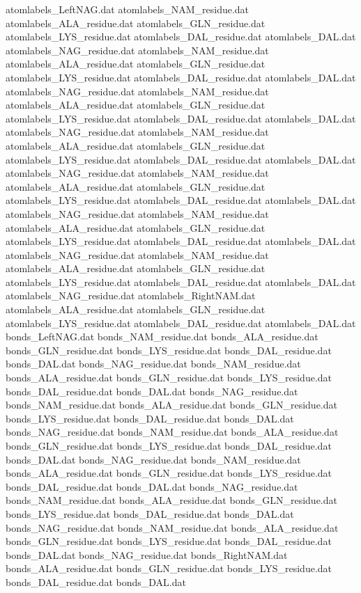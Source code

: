 atomlabels_LeftNAG.dat
atomlabels_NAM_residue.dat
atomlabels_ALA_residue.dat
atomlabels_GLN_residue.dat
atomlabels_LYS_residue.dat
atomlabels_DAL_residue.dat
atomlabels_DAL.dat
atomlabels_NAG_residue.dat
atomlabels_NAM_residue.dat
atomlabels_ALA_residue.dat
atomlabels_GLN_residue.dat
atomlabels_LYS_residue.dat
atomlabels_DAL_residue.dat
atomlabels_DAL.dat
atomlabels_NAG_residue.dat
atomlabels_NAM_residue.dat
atomlabels_ALA_residue.dat
atomlabels_GLN_residue.dat
atomlabels_LYS_residue.dat
atomlabels_DAL_residue.dat
atomlabels_DAL.dat
atomlabels_NAG_residue.dat
atomlabels_NAM_residue.dat
atomlabels_ALA_residue.dat
atomlabels_GLN_residue.dat
atomlabels_LYS_residue.dat
atomlabels_DAL_residue.dat
atomlabels_DAL.dat
atomlabels_NAG_residue.dat
atomlabels_NAM_residue.dat
atomlabels_ALA_residue.dat
atomlabels_GLN_residue.dat
atomlabels_LYS_residue.dat
atomlabels_DAL_residue.dat
atomlabels_DAL.dat
atomlabels_NAG_residue.dat
atomlabels_NAM_residue.dat
atomlabels_ALA_residue.dat
atomlabels_GLN_residue.dat
atomlabels_LYS_residue.dat
atomlabels_DAL_residue.dat
atomlabels_DAL.dat
atomlabels_NAG_residue.dat
atomlabels_NAM_residue.dat
atomlabels_ALA_residue.dat
atomlabels_GLN_residue.dat
atomlabels_LYS_residue.dat
atomlabels_DAL_residue.dat
atomlabels_DAL.dat
atomlabels_NAG_residue.dat
atomlabels_RightNAM.dat
atomlabels_ALA_residue.dat
atomlabels_GLN_residue.dat
atomlabels_LYS_residue.dat
atomlabels_DAL_residue.dat
atomlabels_DAL.dat
bonds_LeftNAG.dat
bonds_NAM_residue.dat
bonds_ALA_residue.dat
bonds_GLN_residue.dat
bonds_LYS_residue.dat
bonds_DAL_residue.dat
bonds_DAL.dat
bonds_NAG_residue.dat
bonds_NAM_residue.dat
bonds_ALA_residue.dat
bonds_GLN_residue.dat
bonds_LYS_residue.dat
bonds_DAL_residue.dat
bonds_DAL.dat
bonds_NAG_residue.dat
bonds_NAM_residue.dat
bonds_ALA_residue.dat
bonds_GLN_residue.dat
bonds_LYS_residue.dat
bonds_DAL_residue.dat
bonds_DAL.dat
bonds_NAG_residue.dat
bonds_NAM_residue.dat
bonds_ALA_residue.dat
bonds_GLN_residue.dat
bonds_LYS_residue.dat
bonds_DAL_residue.dat
bonds_DAL.dat
bonds_NAG_residue.dat
bonds_NAM_residue.dat
bonds_ALA_residue.dat
bonds_GLN_residue.dat
bonds_LYS_residue.dat
bonds_DAL_residue.dat
bonds_DAL.dat
bonds_NAG_residue.dat
bonds_NAM_residue.dat
bonds_ALA_residue.dat
bonds_GLN_residue.dat
bonds_LYS_residue.dat
bonds_DAL_residue.dat
bonds_DAL.dat
bonds_NAG_residue.dat
bonds_NAM_residue.dat
bonds_ALA_residue.dat
bonds_GLN_residue.dat
bonds_LYS_residue.dat
bonds_DAL_residue.dat
bonds_DAL.dat
bonds_NAG_residue.dat
bonds_RightNAM.dat
bonds_ALA_residue.dat
bonds_GLN_residue.dat
bonds_LYS_residue.dat
bonds_DAL_residue.dat
bonds_DAL.dat
